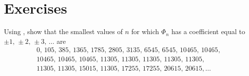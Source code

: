 \section{Exercises}
\label{sect1-trans-fourier-val-finite-field-exercises}
 
 
 
\begin{exo}
\label{exo-calculus-pol-cyclotomic}
 
 Using \Maple{}, show that the smallest values of $ n $ for which $ \Phi_n $ has a coefficient equal to $ \pm 1, \, \pm 2, \, \pm 3, \, \ldots $ are
\begin{equation*}
\begin{split}
& 0, \, 105, \, 385, \, 1365, \, 1785, \, 2805, \, 3135, \, 6545, \, 6545, \, 10465, \, 10465, \, \\
& 10465, \, 10465, \, 10465, \, 11305, \, 11305, \, 11305, \, 11305, \, 11305, \, \\
& 11305, \, 11305, \, 15015, \, 11305, \, 17255, \, 17255, \, 20615, \, 20615, \ldots
\end{split}
\end{equation*}
\end{exo}
 
